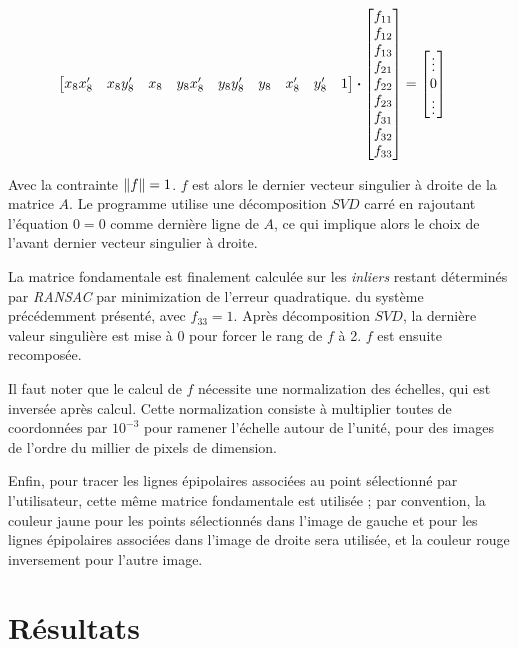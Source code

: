 \documentclass[12pt,a4paper,onecolumn]{article}
\begin{document}
\begin{equation*}
\begin{split}
\begin{bmatrix}
			x_8x_8^{\prime} & x_8y_8^{\prime} & x_8 & y_8x_8^{\prime} & y_8y_8^{\prime} & y_8 & x_8^{\prime} & y_8^{\prime} & 1
		\end{bmatrix}
		\dotproduct
		\begin{bmatrix}
			f_{11} \\
			f_{12} \\
			f_{13} \\
			f_{21} \\
			f_{22} \\
			f_{23} \\
			f_{31} \\
			f_{32} \\
			f_{33}
		\end{bmatrix}
		&=
		\begin{bmatrix}
			\vdots \\
			0      \\
			\vdots
		\end{bmatrix}
	\end{split}
\end{equation*}

Avec la contrainte \( \norm{f} = 1\). \( f\) est alors le dernier vecteur singulier à droite de la matrice \( A\). Le programme utilise une décomposition \(SVD\) carré en rajoutant l'équation \( 0 = 0\) comme dernière ligne de \(A\), ce qui implique alors le choix de l'avant dernier vecteur singulier à droite.

La matrice fondamentale est finalement calculée sur les \textit{inliers} restant déterminés par \textit{RANSAC} par minimization de l'erreur quadratique. du système précédemment présenté, avec \( f_{33} = 1\). Après décomposition \(SVD\), la dernière valeur singulière est mise à 0 pour forcer le rang de \( f\) à 2. \(f\) est ensuite recomposée.

Il faut noter que le calcul de \(f\) nécessite une normalization des échelles, qui est inversée après calcul. Cette normalization consiste à multiplier toutes de coordonnées par \( 10^{-3} \) pour ramener l'échelle autour de l'unité, pour des images de l'ordre du millier de pixels de dimension.

Enfin, pour tracer les lignes épipolaires associées au point sélectionné par l'utilisateur, cette même matrice fondamentale est utilisée ; par convention, la couleur jaune pour les points sélectionnés dans l'image de gauche et pour les lignes épipolaires associées dans l'image de droite sera utilisée, et la couleur rouge inversement pour l'autre image.

\section{Résultats}
\end{document}
